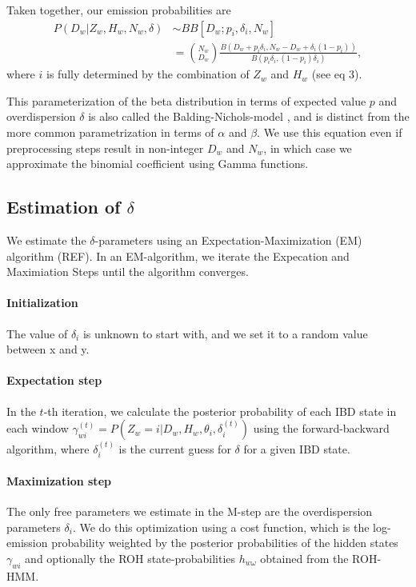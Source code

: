 \documentclass[12pt, letterpaper]{article}
\begin{document}
Taken together, our emission probabilities are 
\begin{align}\label{eq:3}
P(D_{w}|Z_w,H_w,N_w, \delta) &\sim BB[D_w; p_i, \delta_i, N_w] \nonumber\\
&= \binom{N_w}{D_w}\frac{B(D_w+p_i \delta_{i}, N_w-D_w+ \delta_{i}(1-p_{i}))}{ B(p_{i}\delta_{i}, (1-p_{i})\delta_{i})},
\end{align}
where $i$ is fully determined by the combination of $Z_w$ and $H_w$ (see eq 3).

This parameterization of the beta distribution in terms of expected value $p$ and overdispersion $\delta$ is also called the Balding-Nichols-model \cite{balding_method_nodate}, and is distinct from the more common parametrization in terms of $\alpha$ and $\beta$. We use this equation even if preprocessing steps result in non-integer $D_w$ and $N_w$, in which case we approximate the binomial coefficient using Gamma functions.   

\subsection{Estimation of $\delta$}\label{delta}
We estimate the $\delta$-parameters using an Expectation-Maximization (EM) algorithm (REF). In an EM-algorithm, we iterate the Expecation and Maximiation Steps until the algorithm converges.

\paragraph{Initialization}
The value of $\delta_i$ is unknown to start with, and we set it to a random value between x and y.

\paragraph{Expectation step}
In the $t$-th iteration, we calculate the posterior probability of each IBD state in each window $\gamma^{(t)}_{wi} = P(Z_w=i | D_w, H_w, \theta_i, \delta_i^{(t)})$ using the forward-backward algorithm, where $\delta_i^{(t)}$ is the current guess for $\delta$ for a given IBD state.

\paragraph{Maximization step}
The only free parameters we estimate in the M-step are the overdispersion parameters $\delta_i$. We do this optimization using a cost function, which is the log-emission probability weighted by the posterior probabilities of the hidden states $\gamma_{wi}$ and optionally the ROH state-probabilities $h_{w\omega}$ obtained from the ROH-HMM.
\end{document}
